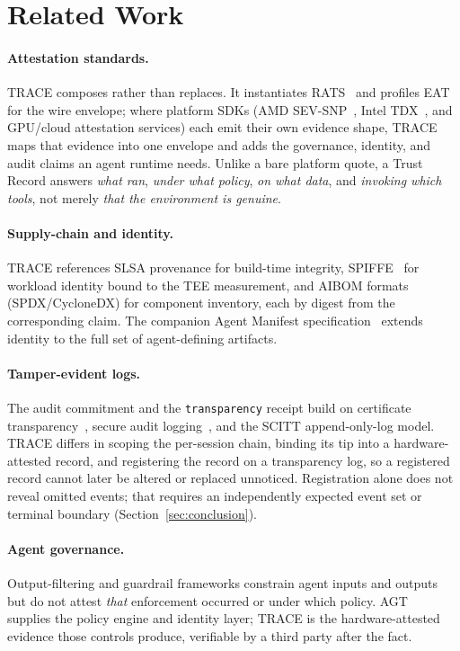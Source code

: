\section{Related Work}
\label{sec:related}

\paragraph{Attestation standards.}
TRACE composes rather than replaces. It instantiates RATS~\citep{rats2021} and
profiles EAT~\citep{eat2023} for the wire envelope; where platform SDKs (AMD
SEV-SNP~\citep{amdsevsnp2023}, Intel TDX~\citep{inteltdx2023}, and GPU/cloud
attestation services) each emit their own evidence shape, TRACE maps that evidence
into one envelope and adds the governance, identity, and audit claims an agent
runtime needs. Unlike a bare platform quote, a Trust Record answers \emph{what ran},
\emph{under what policy}, \emph{on what data}, and \emph{invoking which tools}, not
merely \emph{that the environment is genuine}.

\paragraph{Supply-chain and identity.}
TRACE references SLSA provenance for build-time integrity, SPIFFE~\citep{spiffe2018}
for workload identity bound to the TEE measurement, and AIBOM formats (SPDX/CycloneDX)
for component inventory, each by digest from the corresponding claim. The
companion Agent Manifest specification~\citep{manifest2026} extends identity to the
full set of agent-defining artifacts.

\paragraph{Tamper-evident logs.}
The audit commitment and the \texttt{transparency} receipt build on certificate
transparency~\citep{ct2013}, secure audit logging~\citep{seclog2000}, and the SCITT
append-only-log model. TRACE differs in scoping the per-session chain, binding its
tip into a hardware-attested record, and registering the record on a transparency
log, so a registered record cannot later be altered or replaced
unnoticed. Registration alone does not reveal omitted events; that requires an
independently expected event set or terminal boundary (Section~\ref{sec:conclusion}).

\paragraph{Agent governance.}
Output-filtering and guardrail frameworks constrain agent inputs and outputs but do
not attest \emph{that} enforcement occurred or under which policy. AGT~\citep{agt2026}
supplies the policy engine and identity layer; TRACE is the hardware-attested
evidence those controls produce, verifiable by a third party after the fact.
